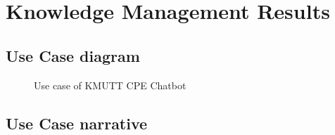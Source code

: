 \documentclass[12pt,oneside,openright,a4paper]{cpe-english-project}
\begin{document}
\section{Knowledge Management Results}
	\subsection{Use Case diagram}
	\begin{figure}[!h]\centering
		\caption{Use case of KMUTT CPE Chatbot}\label{fig:Use case of KMUTT CPE Chatbot version2}
	\end{figure}
\pagebreak
	\subsection{Use Case narrative}
\end{document}
